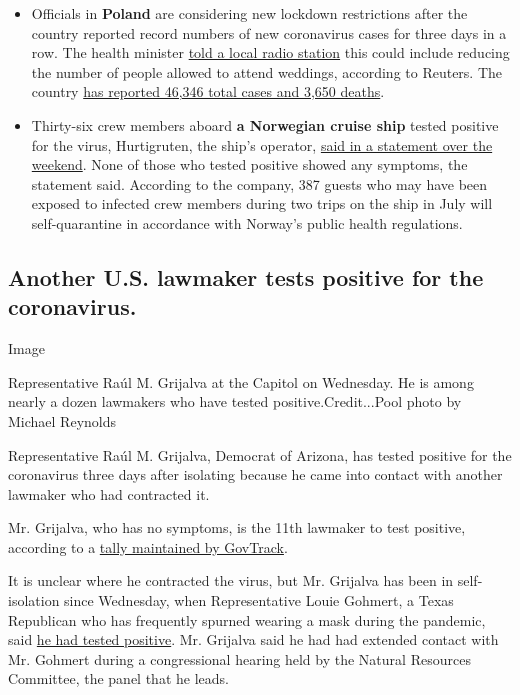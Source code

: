 \begin{itemize}
\item
  Officials in \textbf{Poland} are considering new lockdown restrictions
  after the country reported record numbers of new coronavirus cases for
  three days in a row. The health minister
  \href{https://news.yahoo.com/poland-reports-record-rise-virus-090641415.html}{told
  a local radio station} this could include reducing the number of
  people allowed to attend weddings, according to Reuters. The country
  \href{https://www.nytimes.com/interactive/2020/world/coronavirus-maps.html\#countries}{has
  reported 46,346 total cases and 3,650 deaths}.
\item
  Thirty-six crew members aboard \textbf{a Norwegian cruise ship} tested
  positive for the virus, Hurtigruten, the ship's operator,
  \href{https://presse.hurtigruten.no/pressreleases/33-hurtigruten-crew-members-tested-positive-for-covid-19-3024215}{said
  in a statement over the weekend}. None of those who tested positive
  showed any symptoms, the statement said. According to the company, 387
  guests who may have been exposed to infected crew members during two
  trips on the ship in July will self-quarantine in accordance with
  Norway's public health regulations.
\end{itemize}

\hypertarget{another-us-lawmaker-tests-positive-for-the-coronavirus}{%
\subsection{Another U.S. lawmaker tests positive for the
coronavirus.}\label{another-us-lawmaker-tests-positive-for-the-coronavirus}}

Image

Representative Raúl M. Grijalva at the Capitol on Wednesday. He is among
nearly a dozen lawmakers who have tested positive.Credit...Pool photo by
Michael Reynolds

Representative Raúl M. Grijalva, Democrat of Arizona, has tested
positive for the coronavirus three days after isolating because he came
into contact with another lawmaker who had contracted it.

Mr. Grijalva, who has no symptoms, is the 11th lawmaker to test
positive, according to a
\href{https://slack-redir.net/link?url=https\%3A\%2F\%2Fwww.govtrack.us\%2Fcovid-19\%23legislators}{tally
maintained by GovTrack}.

It is unclear where he contracted the virus, but Mr. Grijalva has been
in self-isolation since Wednesday, when Representative Louie Gohmert, a
Texas Republican who has frequently spurned wearing a mask during the
pandemic, said
\href{https://www.nytimes.com/2020/07/29/us/politics/louie-gohmert-positive-coronavirus-mask.html}{he
had tested positive}. Mr. Grijalva said he had had extended contact with
Mr. Gohmert during a congressional hearing held by the Natural Resources
Committee, the panel that he leads.

